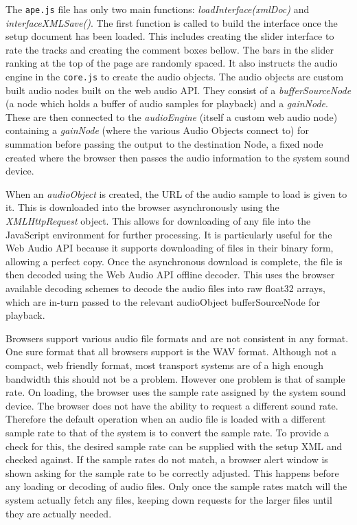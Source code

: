 \documentclass{article}
\begin{document}
The \texttt{ape.js} file has only two main functions: \textit{loadInterface(xmlDoc)} and \textit{interfaceXMLSave()}. The first function is called to build the interface once the setup document has been loaded. This includes creating the slider interface to rate the tracks and creating the comment boxes bellow. The bars in the slider ranking at the top of the page are randomly spaced. It also instructs the audio engine in the \texttt{core.js} to create the audio objects. The audio objects are custom built audio nodes built on the web audio API. They consist of a \textit{bufferSourceNode} (a node which holds a buffer of audio samples for playback) and a \textit{gainNode}. These are then connected to the \textit{audioEngine} (itself a custom web audio node) containing a \textit{gainNode} (where the various Audio Objects connect to) for summation before passing the output to the destination Node, a fixed node created where the browser then passes the audio information to the system sound device.

When an \textit{audioObject} is created, the URL of the audio sample to load is given to it. This is downloaded into the browser asynchronously using the \textit{XMLHttpRequest} object. This allows for downloading of any file into the JavaScript environment for further processing. It is particularly useful for the Web Audio API because it supports downloading of files in their binary form, allowing a perfect copy. Once the asynchronous download is complete, the file is then decoded using the Web Audio API offline decoder. This uses the browser available decoding schemes to decode the audio files into raw float32 arrays, which are in-turn passed to the relevant audioObject bufferSourceNode for playback.

Browsers support various audio file formats and are not consistent in any format. One sure format that all browsers support is the WAV format. Although not a compact, web friendly format, most transport systems are of a high enough bandwidth this should not be a problem. However one problem is that of sample rate. On loading, the browser uses the sample rate assigned by the system sound device. The browser does not have the ability to request a different sound rate. Therefore the default operation when an audio file is loaded with a different sample rate to that of the system is to convert the sample rate. To provide a check for this, the desired sample rate can be supplied with the setup XML and checked against. If the sample rates do not match, a browser alert window is shown asking for the sample rate to be correctly adjusted. This happens before any loading or decoding of audio files. Only once the sample rates match will the system actually fetch any files, keeping down requests for the larger files until they are actually needed.
\end{document}
